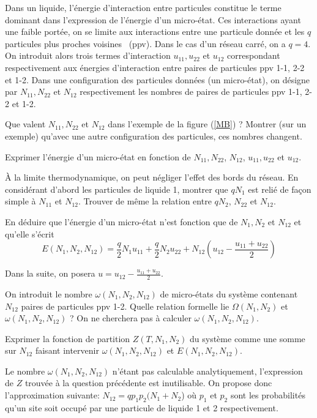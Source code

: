
Dans un liquide, l'énergie d'interaction entre particules constitue le terme dominant dans l'expression de l'énergie d'un micro-état. Ces interactions ayant une faible portée, on se limite aux interactions entre une particule donnée et les $q$ particules \og plus proches voisines \fg \ (ppv). Dans le cas d'un réseau carré, on a $q = 4$. On introduit alors trois termes d'interaction $u_{11}, u_{22}$ et $u_{12}$ correspondant respectivement aux énergies d'interaction entre paires de particules ppv 1-1, 2-2 et 1-2. Dans une configuration des particules données (un micro-état), on désigne par $N_{11}, N_{22}$ et $N_{12}$ respectivement les nombres de paires de particules ppv 1-1, 2-2 et 1-2.

\question
Que valent $N_{11}, N_{22}$ et $N_{12}$ dans l'exemple de la figure (\ref{MB}) ? Montrer (sur un exemple) qu'avec une autre configuration des particules, ces nombres changent.

\question
Exprimer l'énergie d'un micro-état en fonction de $N_{11}, N_{22}$, $N_{12}$, $u_{11}, u_{22}$ et $u_{12}$.

\question
\`A la limite thermodynamique, on peut négliger l'effet des bords du réseau. En considérant d'abord les particules de liquide 1, montrer que $q N_1$ est relié de façon simple à $N_{11}$ et  $N_{12}$. Trouver de même la relation entre $q N_2$, $N_{22}$ et  $N_{12}$.

\question
En déduire que l'énergie d'un micro-état n'est fonction que de $N_1, N_2$ et $N_{12}$ et qu'elle s'écrit
$$
E(N_1, N_2, N_{12})= \frac{q}{2} N_1 u_{11}+\frac{q}{2} N_2 u_{22}+N_{12}(u_{12}-\frac{u_{11}+ u_{22}}{2})
$$

Dans la suite, on posera $u=u_{12}-\frac{u_{11}+ u_{22}}{2}$.

\question
On introduit le nombre $\omega(N_1, N_2, N_{12})$ de micro-états du système contenant $N_{12}$ paires de particules ppv 1-2. Quelle relation formelle lie $\Omega(N_1, N_2)$ et $\omega(N_1, N_2, N_{12})$ ? On ne cherchera pas à calculer $\omega(N_1, N_2, N_{12})$.

\question
Exprimer la fonction de partition $Z(T, N_1, N_2)$ du système comme une somme sur $N_{12}$
 faisant intervenir $\omega(N_1, N_2, N_{12})$ et $E(N_1, N_2, N_{12})$.



Le nombre $\omega(N_1, N_2, N_{12})$ n'étant pas calculable analytiquement, l'expression de $Z$
trouvée à la question précédente est inutilisable. On propose donc l'approximation suivante: $N_{12}=qp_1p_2(N_1 + N_2$) où $p_1$ et $p_2$ sont les probabilités qu'un site soit occupé par une particule de liquide 1 et 2 respectivement.

